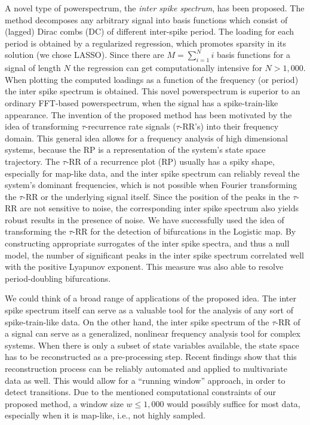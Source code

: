 A novel type of powerspectrum, the \textit{inter spike spectrum}, has been proposed. The method decomposes any arbitrary signal into basis functions which consist of (lagged) Dirac 
combs (DC) of different inter-spike period. The loading for each period is obtained by a regularized regression, which promotes sparsity in its solution (we chose LASSO). Since there are 
$M = \sum_{i=1}^{N}i$ basis functions for a signal of length $N$ the regression can get computationally intensive for $N>1,000$. When plotting the computed loadings as a function 
of the frequency (or period) the inter spike spectrum is obtained. This novel powerspectrum is superior to an ordinary FFT-based powerspectrum, when the signal has a spike-train-like 
appearance. The invention of the proposed method has been motivated by the idea of transforming $\tau$-recurrence rate signals ($\tau$-RR's) into their frequency domain. 
This general idea \cite{Zbilut2008} allows for a frequency analysis of high dimensional systems, because the RP is a representation of the system's state space trajectory.   
The $\tau$-RR of a recurrence plot (RP) usually has a spiky shape, especially for map-like data, and the inter spike spectrum can reliably reveal the system's dominant frequencies, 
which is not possible when Fourier transforming the $\tau$-RR or the underlying signal itself. Since the position of the peaks 
in the $\tau$-RR are not sensitive to noise, the corresponding inter spike spectrum also yields robust results in the presence of noise. We have successfully used the idea 
of transforming the $\tau$-RR for the detection of bifurcations in the Logistic map. By constructing appropriate surrogates of the inter spike spectra, and thus a null model, 
the number of significant peaks in the inter spike spectrum correlated well with the positive Lyapunov exponent. This measure was also able to resolve period-doubling bifurcations. 

We could think of a broad range of applications of the proposed idea. The inter spike spectrum itself can serve as a valuable tool for the analysis of any sort of 
spike-train-like data. On the other hand, the inter spike spectrum of the $\tau$-RR of a signal can serve as a generalized, nonlinear frequency analysis tool for complex systems. 
When there is only a subset of state variables available, the state space has to be reconstructed as a pre-processing step. Recent findings \cite{Kraemer2021} show that 
this reconstruction process can be reliably automated and applied to multivariate data as well. This would allow for a ``running window'' approach, in order to detect transitions. 
Due to the mentioned computational constraints of our proposed method, a window size $w\leq 1,000$ would possibly suffice for most data, especially when it is map-like, i.e., not 
highly sampled.  


